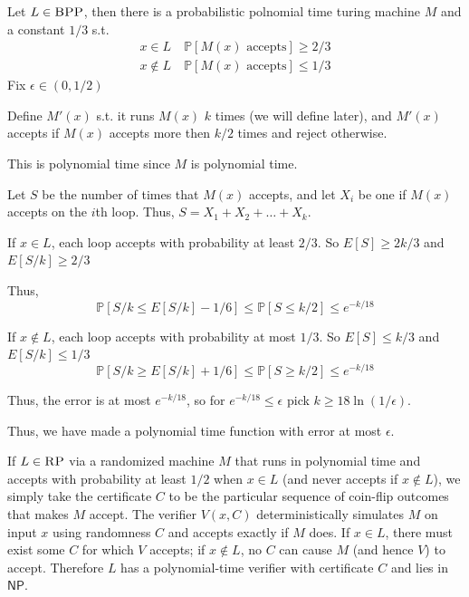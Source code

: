 \documentclass[12pt, letterpaper]{article}
\renewcommand{\P}{\mathbb{P}}
\newcommand{\NP}{\mathsf{NP}}
\renewcommand{\t}[1]{\text{#1}}
\begin{document}
\begin{subproblem}{}
   
\end{subproblem}
\begin{problemproof}
    Let $L \in \textsc{BPP}$, then there is a probabilistic polnomial time turing machine $M$ and a constant $1/3$ s.t.
    \begin{align*}
        x \in L \quad  \P[M(x) \t{ accepts}] \geq 2/3\\
        x \notin L \quad \P[M(x) \t{ accepts}] \leq 1/3
    \end{align*}
    Fix $\epsilon \in (0,1/2)$

    Define $M'(x)$ s.t. it runs $M(x)$ $k$ times (we will define later), and $M'(x)$ accepts if $M(x)$ accepts more then $k/2$ times and reject otherwise.

    This is polynomial time since $M$ is polynomial time.

    Let $S$ be the number of times that $M(x)$ accepts, and let $X_i$ be one if $M(x)$ accepts on the $i$th loop. Thus, $S=X_1+X_2+\dots+X_k$.

    If $x \in L$, each loop accepts with probability at least $2/3$. So $E[S]\geq 2k/3$ and $E[S/k] \geq 2/3$

    Thus,
    \[\P[S/k \leq E[S/k]-1/6] \leq \P[S \leq k/2] \leq e^{-k/18}\]

    If $x \notin L$, each loop accepts with probability at most $1/3$. So $E[S] \leq k/3$ and $E[S/k] \leq 1/3$
    \[\P[S/k \geq E[S/k]+1/6] \leq \P[S \geq k/2] \leq e^{-k/18}\]

    Thus, the error is at most $e^{-k/18}$, so for $e^{-k/18} \leq \epsilon$ pick $k \geq 18 \ln(1/\epsilon)$.

    Thus, we have made a polynomial time function with error at most $\epsilon$.
\end{problemproof}
\newcommand{\RP}{\textsc{RP}}
\begin{subproblem}{}
    
\end{subproblem}
\begin{problemproof}
    If \(L\in\RP\) via a randomized machine \(M\) that runs in polynomial time and accepts with probability at least \(1/2\) when \(x\in L\) (and never accepts if \(x\notin L\)), we simply take the certificate \(C\) to be the particular sequence of coin-flip outcomes that makes \(M\) accept.  The verifier \(V(x,C)\) deterministically simulates \(M\) on input \(x\) using randomness \(C\) and accepts exactly if \(M\) does.  If \(x\in L\), there must exist some \(C\) for which \(V\) accepts; if \(x\notin L\), no \(C\) can cause \(M\) (and hence \(V\)) to accept.  Therefore \(L\) has a polynomial-time verifier with certificate \(C\) and lies in $\NP$.
\end{problemproof}
\end{document}
